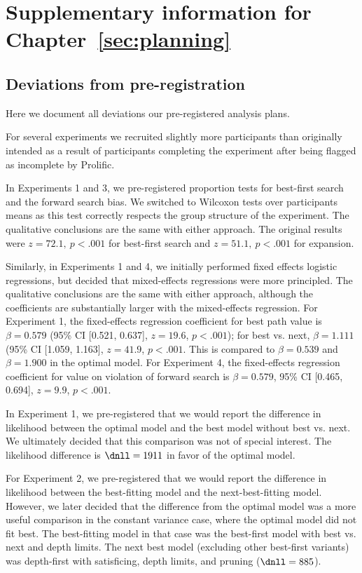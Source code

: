 
\chapter{Supplementary information for Chapter~\ref{sec:planning}}\label{app:planning}

\section{Deviations from pre-registration}\label{app:planning-deviations}
Here we document all deviations our pre-registered analysis plans.

For several experiments we recruited slightly more participants than originally intended as a result of participants completing the experiment after being flagged as incomplete by Prolific.

In Experiments 1 and 3, we pre-registered proportion tests for best-first search and the forward search bias. We switched to Wilcoxon tests over participants means as this test correctly respects the group structure of the experiment. The qualitative conclusions are the same with either approach. The original results were $z=72.1,\ p < .001$ for best-first search and $z=51.1,\ p < .001$ for expansion.

Similarly, in Experiments 1 and 4, we initially performed fixed effects logistic regressions, but decided that mixed-effects regressions were more principled. The qualitative conclusions are the same with either approach, although the coefficients are substantially larger with the mixed-effects regression. For Experiment 1, the fixed-effects regression coefficient for best path value is $\beta = 0.579$ (95\% CI [0.521, 0.637], $z = 19.6$, $p < .001$); for best vs. next, $\beta = 1.111$ (95\% CI [1.059, 1.163], $z = 41.9$, $p < .001$. This is compared to $\beta = 0.539$ and $\beta = 1.900$ in the optimal model. For Experiment 4, the fixed-effects regression coefficient for value on violation of forward search is $\beta = 0.579$, 95\% CI [0.465, 0.694], $z = 9.9$, $p < .001$.

In Experiment 1, we pre-registered that we would report the difference in likelihood between the optimal model and the best model without best vs. next. We ultimately decided that this comparison was not of special interest. The likelihood difference is $\dnll = 1911$ in favor of the optimal model.

For Experiment 2, we pre-registered that we would report the difference in likelihood between the best-fitting model and the next-best-fitting model. However, we later decided that the difference from the optimal model was a more useful comparison in the constant variance case, where the optimal model did not fit best. The best-fitting model in that case was the best-first model with best vs. next and depth limits. The next best model (excluding other best-first variants) was depth-first with satisficing, depth limits, and pruning ($\dnll = 885$).

